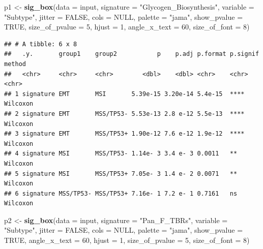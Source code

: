 \documentclass[
  12pt,
]{book}
\newenvironment{Shaded}{\begin{snugshade}}{\end{snugshade}}
\newcommand{\AttributeTok}[1]{\textcolor[rgb]{0.13,0.29,0.53}{#1}}
\newcommand{\ConstantTok}[1]{\textcolor[rgb]{0.56,0.35,0.01}{#1}}
\newcommand{\DecValTok}[1]{\textcolor[rgb]{0.00,0.00,0.81}{#1}}
\newcommand{\FunctionTok}[1]{\textcolor[rgb]{0.13,0.29,0.53}{\textbf{#1}}}
\newcommand{\NormalTok}[1]{#1}
\newcommand{\OtherTok}[1]{\textcolor[rgb]{0.56,0.35,0.01}{#1}}
\newcommand{\StringTok}[1]{\textcolor[rgb]{0.31,0.60,0.02}{#1}}
\begin{document}
\begin{Shaded}
\begin{Highlighting}[]
\NormalTok{p1 }\OtherTok{\textless{}{-}} \FunctionTok{sig\_box}\NormalTok{(}\AttributeTok{data           =}\NormalTok{ input, }
              \AttributeTok{signature      =} \StringTok{"Glycogen\_Biosynthesis"}\NormalTok{,}
              \AttributeTok{variable       =} \StringTok{"Subtype"}\NormalTok{,}
              \AttributeTok{jitter         =} \ConstantTok{FALSE}\NormalTok{,}
              \AttributeTok{cols           =}  \ConstantTok{NULL}\NormalTok{,}
              \AttributeTok{palette        =} \StringTok{"jama"}\NormalTok{,}
              \AttributeTok{show\_pvalue    =} \ConstantTok{TRUE}\NormalTok{,}
              \AttributeTok{size\_of\_pvalue =} \DecValTok{5}\NormalTok{,}
              \AttributeTok{hjust          =} \DecValTok{1}\NormalTok{, }
              \AttributeTok{angle\_x\_text   =} \DecValTok{60}\NormalTok{, }
              \AttributeTok{size\_of\_font   =} \DecValTok{8}\NormalTok{)}
\end{Highlighting}
\end{Shaded}

\begin{verbatim}
## # A tibble: 6 x 8
##   .y.       group1    group2           p    p.adj p.format p.signif method  
##   <chr>     <chr>     <chr>        <dbl>    <dbl> <chr>    <chr>    <chr>   
## 1 signature EMT       MSI       5.39e-15 3.20e-14 5.4e-15  ****     Wilcoxon
## 2 signature EMT       MSS/TP53- 5.53e-13 2.8 e-12 5.5e-13  ****     Wilcoxon
## 3 signature EMT       MSS/TP53+ 1.90e-12 7.6 e-12 1.9e-12  ****     Wilcoxon
## 4 signature MSI       MSS/TP53- 1.14e- 3 3.4 e- 3 0.0011   **       Wilcoxon
## 5 signature MSI       MSS/TP53+ 7.05e- 3 1.4 e- 2 0.0071   **       Wilcoxon
## 6 signature MSS/TP53- MSS/TP53+ 7.16e- 1 7.2 e- 1 0.7161   ns       Wilcoxon
\end{verbatim}

\begin{Shaded}
\begin{Highlighting}[]
\NormalTok{p2 }\OtherTok{\textless{}{-}} \FunctionTok{sig\_box}\NormalTok{(}\AttributeTok{data           =}\NormalTok{ input, }
              \AttributeTok{signature      =} \StringTok{"Pan\_F\_TBRs"}\NormalTok{,}
              \AttributeTok{variable       =} \StringTok{"Subtype"}\NormalTok{,}
              \AttributeTok{jitter         =} \ConstantTok{FALSE}\NormalTok{,}
              \AttributeTok{cols           =} \ConstantTok{NULL}\NormalTok{,}
              \AttributeTok{palette        =} \StringTok{"jama"}\NormalTok{,}
              \AttributeTok{show\_pvalue    =} \ConstantTok{TRUE}\NormalTok{,}
              \AttributeTok{angle\_x\_text   =} \DecValTok{60}\NormalTok{, }
              \AttributeTok{hjust          =} \DecValTok{1}\NormalTok{, }
              \AttributeTok{size\_of\_pvalue =} \DecValTok{5}\NormalTok{, }
              \AttributeTok{size\_of\_font   =} \DecValTok{8}\NormalTok{)}
\end{Highlighting}
\end{Shaded}
\end{document}
